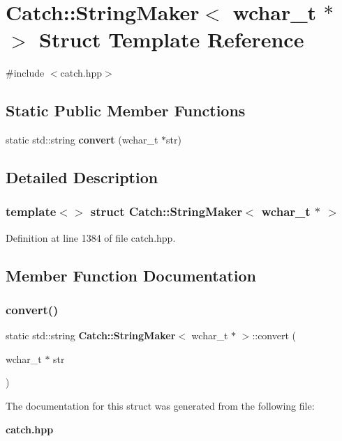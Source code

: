 \section{Catch\+::String\+Maker$<$ wchar\+\_\+t $\ast$ $>$ Struct Template Reference}
\label{struct_catch_1_1_string_maker_3_01wchar__t_01_5_01_4}


{\ttfamily \#include $<$catch.\+hpp$>$}

\subsection*{Static Public Member Functions}
\begin{DoxyCompactItemize}
\item 
static std\+::string \textbf{ convert} (wchar\+\_\+t $\ast$str)
\end{DoxyCompactItemize}


\subsection{Detailed Description}
\subsubsection*{template$<$$>$\newline
struct Catch\+::\+String\+Maker$<$ wchar\+\_\+t $\ast$ $>$}



Definition at line 1384 of file catch.\+hpp.



\subsection{Member Function Documentation}
\mbox{\label{struct_catch_1_1_string_maker_3_01wchar__t_01_5_01_4_a6112fe324da2a0b3a690071a228ecd71}} 
\subsubsection{convert()}
{\footnotesize\ttfamily static std\+::string \textbf{ Catch\+::\+String\+Maker}$<$ wchar\+\_\+t $\ast$ $>$\+::convert (\begin{DoxyParamCaption}\item[{wchar\+\_\+t $\ast$}]{str }\end{DoxyParamCaption})\hspace{0.3cm}{\ttfamily [static]}}



The documentation for this struct was generated from the following file\+:\begin{DoxyCompactItemize}
\item 
\textbf{ catch.\+hpp}\end{DoxyCompactItemize}
